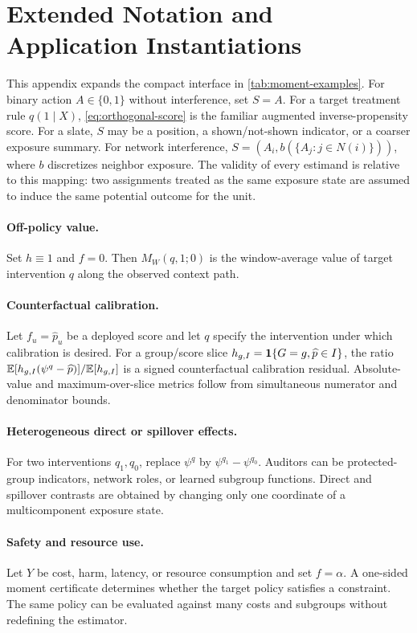 \section{Extended Notation and Application Instantiations}
\label{app:examples}

This appendix expands the compact interface in \cref{tab:moment-examples}. For binary action $A\in\{0,1\}$ without interference, set $S=A$. For a target treatment rule $q(1\mid X)$, \cref{eq:orthogonal-score} is the familiar augmented inverse-propensity score. For a slate, $S$ may be a position, a shown/not-shown indicator, or a coarser exposure summary. For network interference, $S=(A_i,b(\{A_j:j\in N(i)\}))$, where $b$ discretizes neighbor exposure. The validity of every estimand is relative to this mapping: two assignments treated as the same exposure state are assumed to induce the same potential outcome for the unit.

\paragraph{Off-policy value.}
Set $h\equiv1$ and $f=0$. Then $M_W(q,1;0)$ is the window-average value of target intervention $q$ along the observed context path.

\paragraph{Counterfactual calibration.}
Let $f_u=\widehat p_u$ be a deployed score and let $q$ specify the intervention under which calibration is desired. For a group/score slice $h_{g,I}=\mathbf{1}\{G=g,\widehat p\in I\}$, the ratio $\mathbb{E}[h_{g,I}(\psi^q-\widehat p)]/\mathbb{E}[h_{g,I}]$ is a signed counterfactual calibration residual. Absolute-value and maximum-over-slice metrics follow from simultaneous numerator and denominator bounds.

\paragraph{Heterogeneous direct or spillover effects.}
For two interventions $q_1,q_0$, replace $\psi^q$ by $\psi^{q_1}-\psi^{q_0}$. Auditors can be protected-group indicators, network roles, or learned subgroup functions. Direct and spillover contrasts are obtained by changing only one coordinate of a multicomponent exposure state.

\paragraph{Safety and resource use.}
Let $Y$ be cost, harm, latency, or resource consumption and set $f=\alpha$. A one-sided moment certificate determines whether the target policy satisfies a constraint. The same policy can be evaluated against many costs and subgroups without redefining the estimator.

